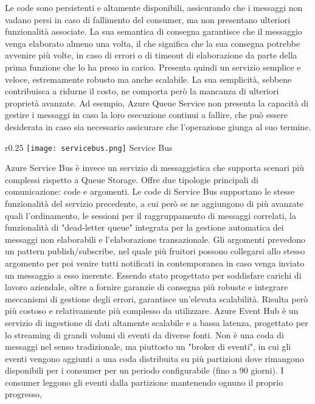 Le code sono persistenti e altamente disponibili,
assicurando che i messaggi non vadano persi in caso di fallimento del consumer,
ma non presentano ulteriori funzionalità associate.
La sua semantica di consegna garantisce che il messaggio venga elaborato almeno una volta,
il che significa che la sua consegna potrebbe avvenire più volte,
in caso di errori o di timeout di elaborazione da parte della prima funzione che lo ha preso in carico.
Presenta quindi un servizio semplice e veloce,
estremamente robusto ma anche scalabile.
La sua semplicità, sebbene contribuisca a ridurne il costo,
ne comporta però la mancanza di ulteriori proprietà avanzate.
Ad esempio, Azure Queue Service non presenta la capacità
di gestire i messaggi in caso la loro esecuzione continui a fallire,
che può essere desiderata in caso sia necessario assicurare che l'operazione giunga al suo termine.\\
\begin{wrapfigure}{r}{0.25\textwidth}
    \centering
    \texttt{[image: servicebus.png]}
    Service Bus
\end{wrapfigure}
Azure Service Bus è invece un servizio di messaggistica
che supporta scenari più complessi rispetto a Queue Storage.
Offre due tipologie principali di comunicazione: code e argomenti.
Le code di Service Bus supportano le stesse funzionalità del servizio precedente,
a cui però se ne aggiungono di più avanzate quali l'ordinamento,
le sessioni per il raggruppamento di messaggi correlati,
la funzionalità di "dead-letter queue" integrata per la gestione automatica dei messaggi non elaborabili e
l'elaborazione transazionale.
Gli argomenti prevedono un pattern publish/subscribe,
nel quale più fruitori possono collegarsi allo stesso argomento per poi
venire tutti notificati in contemporanea in caso venga inviato un messaggio a esso inerente.
Essendo stato progettato per soddisfare carichi di lavoro aziendale,
oltre a fornire garanzie di consegna più robuste e
integrare meccanismi di gestione degli errori,
garantisce un'elevata scalabilità.
Risulta però più costoso e relativamente più complesso da utilizzare.
\clearpage
Azure Event Hub è un servizio di ingestione di dati altamente scalabile e a bassa latenza,
progettato per lo streaming di grandi volumi di eventi da diverse fonti.
Non è una coda di messaggi nel senso tradizionale,
ma piuttosto un "broker di eventi",
in cui gli eventi vengono aggiunti a una coda distribuita su più partizioni
dove rimangono disponibili per i consumer per un periodo configurabile (fino a 90 giorni).
I consumer leggono gli eventi dalla partizione mantenendo ognuno il proprio progresso,

